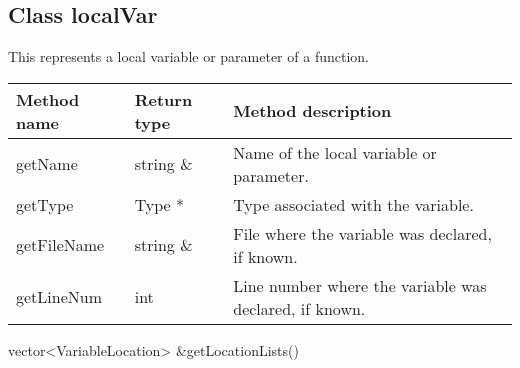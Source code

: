 \subsection{Class localVar}\label{localVar}
This represents a local variable or parameter of a function.


\begin{tabular}{|p{1.25in}|p{1in}|p{3.25in}|}
	\hline
	Method name & Return type & Method description \\
	\hline
	getName & string \& & Name of the local variable or parameter. \\
	getType & Type * & Type associated with the variable. \\
	getFileName & string \& & File where the variable was declared, if known. \\
	getLineNum & int & Line number where the variable was declared, if known. \\
	\hline
\end{tabular}

\begin{apient}
vector<VariableLocation> &getLocationLists()
\end{apient}
